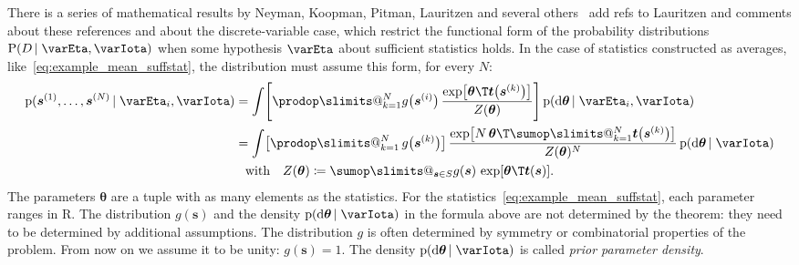 \documentclass[\ifafour a4paper,12pt,\else a5paper,10pt,\fi%
onecolumn,oneside,article,%
british%
]{memoir}
\makeatletter
\theoremstyle{remark}
\theoremstyle{innote}
\def\sum{\DOTSI\sumop\slimits@}
\def\prod{\DOTSI\prodop\slimits@}
\newcommand*{\citep}{\parencites}
\newcommand*{\di}{\mathrm{d}}%
\newcommand*{\RR}{\bm{\mathrm{R}}}
\newcommand*{\defd}{\coloneqq}
\newcommand*{\pf}{\mathrm{p}}%
\newcommand*{\p}{\mathrm{P}}%
\renewcommand*{\|}{\nonscript\,\vert\nonscript\;\mathopen{}}
\newcommand*{\tprod}{\mathop{\textstyle\prod}\nolimits}
\newcommand*{\puzzle}{{\fontencoding{U}\fontfamily{fontawesometwo}\selectfont\symbol{225}}}
\newcommand{\mynote}[1]{ {\color{notecolour}\puzzle\ #1}}
\newcommand*{\yI}{\varIota}
\newcommand*{\ys}{\bm{s}}
\newcommand*{\yt}{\bm{t}}
\newcommand*{\yth}{\bm{\theta}}
\newcommand*{\yso}[1]{\ys^{(#1)}}
\newcommand*{\yH}{\varEta}
\newcommand*{\yD}{D}
\makeatother
\begin{document}
There is a series of mathematical results by Neyman, Koopman, Pitman,
Lauritzen and several others
\citep{neyman1935,koopman1936,pitman1936,darmois1935,lauritzen1982_r1988,kuechleretal1989}[see
also later
analyses:][]{hipp1974,andersen1970,denny1967,fraser1963,barankinetal1963}\mynote{add
  refs to Lauritzen and comments about these references and about the
  discrete-variable case}, which restrict the functional form of the
probability distributions $\p(\yD \| \yH, \yI)$ when some hypothesis $\yH$
about sufficient statistics holds. In the case of statistics constructed as
averages, like~\eqref{eq:example_mean_suffstat}, the distribution must
assume this form, for every $N$:
\begin{multline}
  \label{eq:predictive_KP}
\begin{aligned}
    \pf(\yso{1}, \dotsc, \yso{N} \|\yH_i, \yI )
  &=\int
\Biggl[  \prod_{k=1}^{N}
  g\bigl(\yso{i}\bigr)\,
  \frac{  \exp\bigl[
    \yth\T \yt\bigl( \yso{k} \bigr)
    \bigr] }{Z(\yth)}
  \Biggr]\,
  \pf(\di\yth \| \yH_i, \yI) 
\\
  &=\int
  \bigl[\tprod_{k=1}^{N}g\bigl(\yso{k}\bigr) \bigr]\,
  \frac{  \exp\bigl[
    N \, \yth\T\sum_{k=1}^{N}\yt\bigl( \yso{k} \bigr)
    \bigr]}{Z(\yth)^N}\,
  \pf(\di\yth \| \yI)
\end{aligned}
\\
  \text{with}\quad
  Z(\yth) \defd \sum_{\ys\in S} g(\ys)\, \exp[\yth\T \yt(\ys)].
\end{multline}
The parameters $\yth$ are a tuple with as many elements as the statistics.
For the statistics~\eqref{eq:example_mean_suffstat}, each parameter ranges
in $\RR$. The distribution $g(\ys)$ and the density $\pf(\di\yth \| \yI)$
in the formula above are not determined by the theorem: they need to be
determined by additional assumptions. The distribution $g$ is often
determined by symmetry or combinatorial properties of the problem.
From now on we assume it to be unity: $g(\ys)=1$. The density
$\pf(\di\yth \|\yI)$ is called \emph{prior parameter density}.
\end{document}
